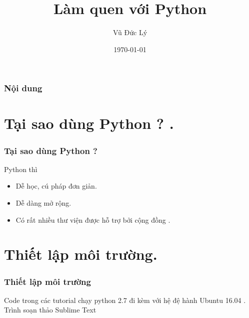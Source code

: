 \documentclass{beamer}
\title[Làm quen với Python]{Làm quen với Python } %
\author{Vũ Đức Lý} %
\date{\today} %
\begin{document}
\begin{frame}
\titlepage %
\hyperlink{intro}{}
\end{frame}

\begin{frame}[label=intro]
\frametitle{Nội dung} %
\tableofcontents %
\end{frame}


\section{Tại sao dùng Python ? .} 
\begin{frame}[label=taisao]
\frametitle{Tại sao dùng Python ?}
Python thì
\begin{itemize}
\item Dễ học, cú pháp đơn giản.
\item Dễ dàng mở rộng.
\item Có rất nhiều thư viện được hỗ trợ bởi cộng đồng .
\end{itemize} 

\hyperlink{intro}{}
\hyperlink{moitruong}{}
\end{frame}

\section{Thiết lập môi trường.} 
\begin{frame}[label=moitruong]
\frametitle{Thiết lập môi trường}

Code trong các tutorial chạy python 2.7 đi kèm với hệ đệ hành Ubuntu 16.04 . Trình soạn thảo Sublime Text 

 
\hyperlink{intro}{}
\hyperlink{cuphap}{}
\end{frame}
\end{document}

